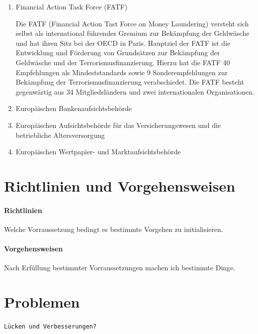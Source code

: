 \documentclass{article}
\begin{document}
            \begin{enumerate}

                \item Financial Action Task Force (FATF)

                    Die FATF (Financial Action Tast Force on Money Laundering) versteht sich selbst als international führendes Gremium zur Bekämpfung der Geldwäsche und hat ihren
                    Sitz bei der OECD in Paris. Hauptziel der FATF ist die Entwicklung und Förderung von Grundsätzen zur Bekämpfung der Geldwäsche und der Terrorismusfinanzierung. Hierzu hat die FATF 40 Empfehlungen als Mindeststandards sowie 9 Sonderempfehlungen zur Bekämpfung der Terrorismusfinanzierung verabschiedet. Die FATF besteht gegenwärtig aus 34 Mitgliedsländern und zwei internationalen Organisationen.

                \item Europäischen Bankenaufsichtsbehörde 

                \item Europäischen Aufsichtsbehörde für das Versicherungswesen und die betriebliche Altersversorgung 

                \item Europäischen Wertpapier- und Marktaufsichtsbehörde 

            \end{enumerate}        


    \section[Richtlinien und Vorgehensweisen]{Richtlinien und Vorgehensweisen}

        \paragraph[Richtlinien]{Richtlinien}
            Welche Vorraussetzung bedingt es bestimmte Vorgehen zu initialisieren.

        \paragraph[Vorgehensweisen]{Vorgehensweisen}
            Nach Erfüllung bestimmter Vorraussetzungen machen ich bestimmte Dinge.

    \section[Probleme]{Problemen}

        \texttt{Lücken und Verbesserungen?}
\end{document}
